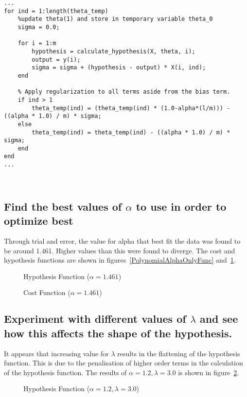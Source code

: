 \documentclass[titlepage]{scrartcl}
\begin{document}
\begin{lstlisting}[firstnumber=23]
...
for ind = 1:length(theta_temp)
    %update theta(1) and store in temporary variable theta_0
    sigma = 0.0;

    for i = 1:m
        hypothesis = calculate_hypothesis(X, theta, i);
        output = y(i);
        sigma = sigma + (hypothesis - output) * X(i, ind);
    end

    % Apply regularization to all terms aside from the bias term.
    if ind > 1
        theta_temp(ind) = (theta_temp(ind) * (1.0-alpha*(l/m))) - ((alpha * 1.0) / m) * sigma;
    else
        theta_temp(ind) = theta_temp(ind) - ((alpha * 1.0) / m) * sigma;
    end
end
...
\end{lstlisting}\leavevmode \\


\subsection{Find the best values of $\alpha$ to use in order to optimize best}
Through trial and error, the value for alpha that best fit the data was found
to be around 1.461. Higher values than this were found to diverge. The cost and
hypothesis functions are shown in figures~\ref{PolynomialAlphaOnlyFunc}
and~\ref{PolynomialAlphaOnlyCost}.

\begin{figure}
    \caption{Hypothesis Function ($\alpha=1.461$)}
    \label{PolynomialAlphaOnlyFunc}
    \caption{Cost Function ($\alpha=1.461$)}
    \label{PolynomialAlphaOnlyCost}
\end{figure}

\subsection{Experiment with different values of $\lambda$ and see how this affects the
    shape of the hypothesis.}
It appears that increasing value for $\lambda$ results in the flattening of the
hypothesis function. This is due to the penalisation of higher order terms in
the calculation of the hypothesis function. The results of $\alpha=1.2,
\lambda=3.0$ is shown in figure~\ref{PolynomialAlphaLambdaFunc}.

\begin{figure}
    \caption{Hypothesis Function ($\alpha=1.2, \lambda=3.0$)}
    \label{PolynomialAlphaLambdaFunc}
\end{figure}
\end{document}
